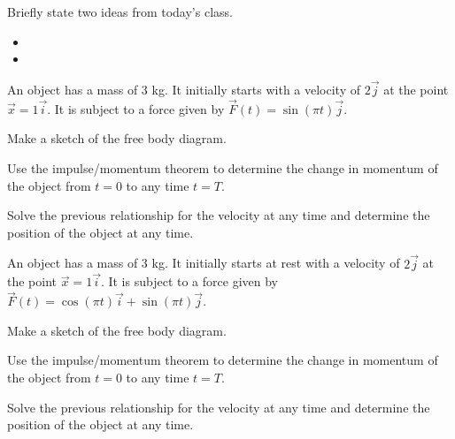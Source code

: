 \postClass

\begin{problem}
\item Briefly state two ideas from today's class.
  \begin{itemize}
  \item 
  \item 
  \end{itemize}
\item An object has a mass of 3 kg. It initially starts with a
  velocity of $2\vec{j}$ at the point $\vec{x}=1\vec{i}$. It is
  subject to a force given by $\vec{F}(t) = \sin(\pi t)\vec{j}$.
  \begin{subproblem}
    \item Make a sketch of the free body diagram.
      \vspace{5em}
    \item Use the impulse/momentum theorem to determine the change in
      momentum of the object from $t=0$ to any time $t=T$.
      \vfill
    \item Solve the previous relationship for the velocity at any time
      and determine the position of the object at any time.
      \vfill
  \end{subproblem}

  \clearpage

\item An object has a mass of 3 kg. It initially starts at rest with a
  velocity of $2\vec{j}$ at the point $\vec{x}=1\vec{i}$. It is
  subject to a force given by
  $\vec{F}(t) = \cos(\pi t)\vec{i}+\sin(\pi t)\vec{j}$.
  \begin{subproblem}
    \item Make a sketch of the free body diagram.
      \vspace{5em}
    \item Use the impulse/momentum theorem to determine the change in
      momentum of the object from $t=0$ to any time $t=T$.
      \vfill
    \item Solve the previous relationship for the velocity at any time
      and determine the position of the object at any time.
      \vfill
  \end{subproblem}
\end{problem}



